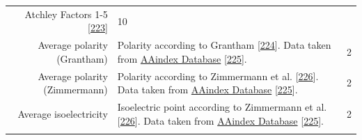 \documentclass[11pt,a4paper,twoside]{book}
\theoremstyle{definition}
\theoremstyle{definition}
\theoremstyle{remark}
\begin{document}
\begin{longtable}[]{@{}rlc@{}}
\begin{minipage}[t]{0.50\columnwidth}
Atchley Factors 1-5 {[}\protect\hyperlink{ref-Atchley2005}{223}{]}\strut
\end{minipage} & \begin{minipage}[t]{0.18\columnwidth}\centering\strut
10\strut
\end{minipage}\tabularnewline
\begin{minipage}[t]{0.23\columnwidth}\raggedleft\strut
Average polarity (Grantham)\strut
\end{minipage} & \begin{minipage}[t]{0.50\columnwidth}\raggedright\strut
Polarity according to Grantham
{[}\protect\hyperlink{ref-Grantham1974}{224}{]}. Data taken from
\href{http://www.genome.jp/dbget-bin/www_bget?aaindex:GRAR740102}{AAindex
Database} {[}\protect\hyperlink{ref-Kawashima2008}{225}{]}.\strut
\end{minipage} & \begin{minipage}[t]{0.18\columnwidth}\centering\strut
2\strut
\end{minipage}\tabularnewline
\begin{minipage}[t]{0.23\columnwidth}\raggedleft\strut
Average polarity (Zimmermann)\strut
\end{minipage} & \begin{minipage}[t]{0.50\columnwidth}\raggedright\strut
Polarity according to Zimmermann et al.
{[}\protect\hyperlink{ref-Zimmerman1968}{226}{]}. Data taken from
\href{http://www.genome.jp/dbget-bin/www_bget?aaindex:ZIMJ680103}{AAindex
Database} {[}\protect\hyperlink{ref-Kawashima2008}{225}{]}.\strut
\end{minipage} & \begin{minipage}[t]{0.18\columnwidth}\centering\strut
2\strut
\end{minipage}\tabularnewline
\begin{minipage}[t]{0.23\columnwidth}\raggedleft\strut
Average isoelectricity\strut
\end{minipage} & \begin{minipage}[t]{0.50\columnwidth}\raggedright\strut
Isoelectric point according to Zimmermann et al.
{[}\protect\hyperlink{ref-Zimmerman1968}{226}{]}. Data taken from
\href{http://www.genome.jp/dbget-bin/www_bget?aaindex:ZIMJ680104}{AAindex
Database} {[}\protect\hyperlink{ref-Kawashima2008}{225}{]}.\strut
\end{minipage} & \begin{minipage}[t]{0.18\columnwidth}\centering\strut
2\strut
\end{minipage}\tabularnewline
\begin{minipage}[t]{0.23\columnwidth}\raggedleft\strut

\end{minipage}
\end{longtable}
\end{document}

